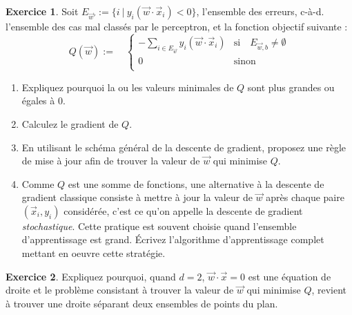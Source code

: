\documentclass[a4paper,francais]{article}
\theoremstyle{definition}
\newtheorem{exercice}{Exercice}[section]
\begin{document}
\begin{exercice}
  Soit $E_{\vec{w}'} := \{i \ | \ y_i (\vec{w}\cdot\vec{x}_i) < 0\}$,
  l'ensemble des erreurs, c-à-d. l'ensemble des cas mal classés par le perceptron, 
  et la fonction objectif suivante :
  \[
  Q(\vec{w}) :=
  \quad
  \left\{
  \begin{array}{ll}
    - \sum_{i \in E_{\vec{w}}} y_i (\vec{w}\cdot\vec{x}_i) & \text{si}\quad E_{\vec{w},b} \neq \emptyset \\
    0 & \text{sinon} \\
  \end{array}
  \right.
  \]

  \begin{enumerate}
  \item Expliquez pourquoi la ou les valeurs minimales de $Q$
    sont plus grandes ou égales à 0. 
  \item Calculez le gradient de $Q$.
  \item En utilisant le schéma général de la descente de gradient,
    proposez une règle de mise à jour afin de trouver la valeur
    de $\vec{w}$ qui minimise $Q$.
  \item Comme $Q$ est une somme de fonctions, une alternative à la descente de gradient classique
  consiste à mettre à jour la valeur de $\vec{w}$ après chaque paire $(\vec{x}_i, y_i)$
  considérée, c'est ce qu'on appelle la descente de gradient \emph{stochastique}.
  Cette pratique est souvent choisie quand l'ensemble d'apprentissage est grand.
  \'Ecrivez l'algorithme d'apprentissage complet mettant en oeuvre cette stratégie. 
  \end{enumerate}
\end{exercice}

\begin{exercice}
  Expliquez pourquoi, quand $d = 2$, $\vec{w}\cdot\vec{x} = 0$
  est une équation de droite et le problème consistant à trouver la
  valeur de $\vec{w}$ qui minimise $Q$, revient à trouver une droite
  séparant deux ensembles de points du plan.
\end{exercice}
\end{document}
